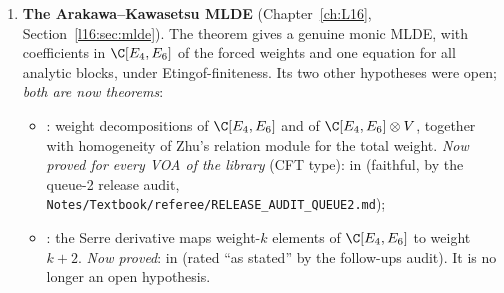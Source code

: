\begin{enumerate}
\begin{itemize}
    () is proved for $m\le2$;
  \item $G_2$, $F_4$, $E_6$, $E_7$, $E_8$:  ($\le(\dim\mathfrak g)^m$), the Demazure
    realizations, and the star bound (, , , ,
    ), checked numerically to orders $q^{60}$, $q^{25}$, $q^{20}$, $q^{16}$, $q^{14}$ respectively (scoping pass of
    28~October~2026, Chapter~\ref{ch:L27}, Section~\ref{l27:sec:starinput}).
  \end{itemize}
  The inputs that remain open in Lean (Chapter~\ref{ch:L27}, Section~\ref{l27:sec:cores}) are the total-dimension bound and
  the graded Demazure realizations beyond $A_2$ and $D_4$, both published theorems not yet formalized (the former with a proof step
  flagged by the project), and the star identities for $G_2$, $F_4$ and the $E$-types, which are conjectures with numerical
  evidence. For $G_2$ the library splits the identity into , which follows from published results
  (Fourier--Littelmann, Chari--Moura, Ardonne--Kedem, Di Francesco--Kedem; Chapter~\ref{ch:L27},
  Section~\ref{l27:sec:starinput}), and , a $q$-series identity that is open (checked through $q^{60}$).
\item \textbf{The Arakawa--Kawasetsu MLDE} (Chapter~\ref{ch:L16}, Section~\ref{l16:sec:mlde}). The theorem
   gives a genuine monic MLDE, with
  coefficients in $\C[E_4,E_6]$ of the forced weights and one equation for all analytic blocks, under Etingof-finiteness.
  Its two other hypotheses were open; \emph{both are now theorems}:
  \begin{itemize}
  \item {}: weight decompositions of $\C[E_4,E_6]$ and of $\C[E_4,E_6]\otimes V$, together with
    homogeneity of Zhu's relation module for the total weight. \emph{Now proved for every VOA of the library} (CFT type):
     in  (faithful, by the queue-2 release audit,
    \texttt{Notes/Textbook/referee/RELEASE\_AUDIT\_QUEUE2.md});
  \item {}: the Serre derivative maps weight-$k$ elements of $\C[E_4,E_6]$ to weight $k+2$.
    \emph{Now proved}:  in  (rated ``as
    stated'' by the follow-ups audit). It is no longer an open hypothesis.

\end{itemize}
\end{enumerate}
